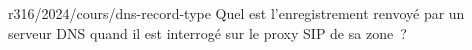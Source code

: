 \begin{question}{r316/2024/cours/dns-record-type}
  Quel est l'enregistrement renvoyé par un serveur DNS quand il est
  interrogé sur le proxy SIP de sa zone~?
  \begin{reponses}
  \end{reponses}
\end{question}

